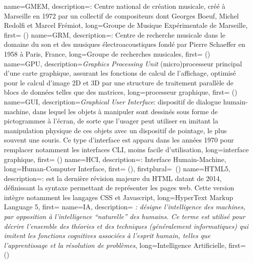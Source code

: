 {
    name={GMEM},
    description={\textit{}: Centre national de création musicale, créé à Marseille en 1972 par un collectif de compositeurs dont Georges Boeuf, Michel Redolfi et Marcel Frémiot},
    long={Groupe de Musique Expérimentale de Marseille},
    first={ ()}
}
{
    name={GRM},
    description={\textit{}: Centre de recherche musicale dans le domaine du son et des musiques électroacoustiques fondé par Pierre Schaeffer en 1958 à Paris, France},
    long={Groupe de recherches musicales},
    first={ ()}
}
{
    name={GPU},
    description={\textit{Graphics Processing Unit} (micro)processeur principal d'une carte graphique, assurant les fonctions de calcul de l'affichage, optimisé pour le calcul d'image 2D et 3D par une structure de traitement parallèle de blocs de données telles que des matrices},
    long={processeur graphique},
    first={ ()}
}
{
    name={GUI},
    description={\textit{Graphical User Interface}: dispositif de dialogue humain-machine, dans lequel les objets à manipuler sont dessinés sous forme de pictogrammes à l'écran, de sorte que l'usager peut utiliser en imitant la manipulation physique de ces objets avec un dispositif de pointage, le plus souvent une souris. Ce type d'interface est apparu dans les années 1970 pour remplacer notamment les interfaces \gls{CLI}, moins facile d'utilisation},
    long={interface graphique},
    first={ ()}
}
{
    name={HCI},
    description={\textit{}: Interface Humain-Machine},
    long={Human-Computer Interface},
    first={ ()},
    firstplural={\glspluralsuffix\ (\glspluralsuffix)}
}
{
    name={HTML5},
    description={\textit{}: est la dernière révision majeure du HTML datant de 2014, définissant la syntaxe permettant de représenter les pages web. Cette version intègre notamment les langages CSS et Javascript},
    long={HyperText Markup Language 5},
    first={}
}
{
    name={IA},
    description={\textit{ : désigne l'intelligence des machines, par opposition à l'intelligence ``naturelle'' des humains. Ce terme est utilisé pour décrire l'ensemble des théories et des techniques (généralement informatiques) qui imitent les fonctions cognitives associées à l'esprit humain, telles que l'apprentissage et la résolution de problèmes}},
    long={Intelligence Artificielle},
    first={ ()}
}
